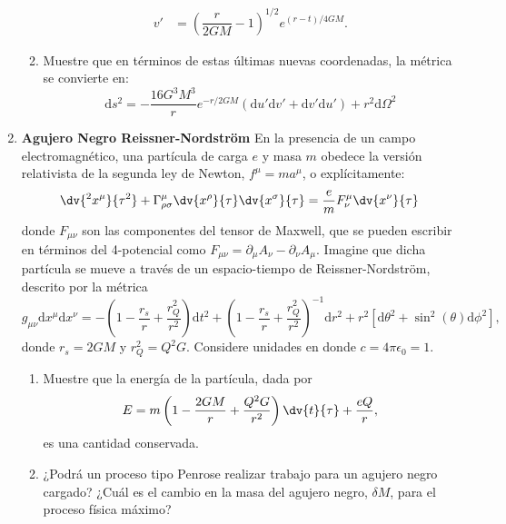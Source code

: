 \documentclass[../main]{subfiles}
\begin{document}
\begin{adjustwidth}{0pt}{-100pt}
\begin{enumerate}
\begin{enumerate}[label=(\alph*)]
\begin{align}
            v'&=\left(\dfrac{r}{2GM}-1\right)^{1/2}e^{(r-t)/4GM}.
        \end{align}
        \item Muestre que en términos de estas últimas nuevas coordenadas, la métrica se convierte en:
        \begin{equation}
            \mathrm{d}s^2=-\dfrac{16G^3 M^3}{r}e^{-r/2GM}(\mathrm{d}u'\mathrm{d}v'+\mathrm{d}v'\mathrm{d}u')+r^2\mathrm{d}\Omega^2
        \end{equation}
    \end{enumerate}
    \item \textbf{Agujero Negro Reissner-Nordström}
    En la presencia de un campo electromagnético, una partícula de carga $e$ y masa $m$ obedece la versión relativista de la segunda ley de Newton, $f^{\mu}=ma^{\mu}$, o explícitamente:
    \begin{equation}
        \dv{^2 x^{\mu}}{\tau^2}+\Gamma^{\mu}_{\rho\sigma}\dv{x^{\rho}}{\tau}\dv{x^{\sigma}}{\tau}=\dfrac{e}{m}F^{\mu}_{\nu}\dv{x^{\nu}}{\tau}
    \end{equation}
    donde $F_{\mu\nu}$ son las componentes del tensor de Maxwell, que se pueden escribir en términos del 4-potencial como $F_{\mu\nu}=\partial_{\mu}A_{\nu}-\partial_{\nu}A_{\mu}$. Imagine que dicha partícula se mueve a través de un espacio-tiempo de Reissner-Nordström, descrito por la métrica 
    \begin{equation}
        g_{\mu\nu}\mathrm{d}x^{\mu}\mathrm{d}x^{\nu}=-\left(1-\dfrac{r_s}{r}+\dfrac{r^2_Q}{r^2}\right)\mathrm{d}t^2+\left(1-\dfrac{r_s}{r}+\dfrac{r^2_Q}{r^2}\right)^{-1}\mathrm{d}r^2+r^2\left[\mathrm{d}\theta^2+\sin^2(\theta)\mathrm{d}\phi^2\right],
    \end{equation}
    donde $r_s=2GM$ y $r^2_Q=Q^2G$. Considere unidades en donde $c=4\pi \epsilon_0=1$.
    \begin{enumerate}[label=(\alph*)]
        \item Muestre que la energía de la partícula, dada por 
        \begin{equation}
            E=m\left(1-\dfrac{2GM}{r}+\dfrac{Q^2 G}{r^2}\right)\dv{t}{\tau}+\dfrac{eQ}{r},
        \end{equation}
        es una cantidad conservada.
        \item ¿Podrá un proceso tipo Penrose realizar trabajo para un agujero negro cargado? ¿Cuál es el cambio en la masa del agujero negro, $\delta M$, para el proceso física máximo?
    \end{enumerate}

\end{enumerate}
\end{adjustwidth}
\end{document}
